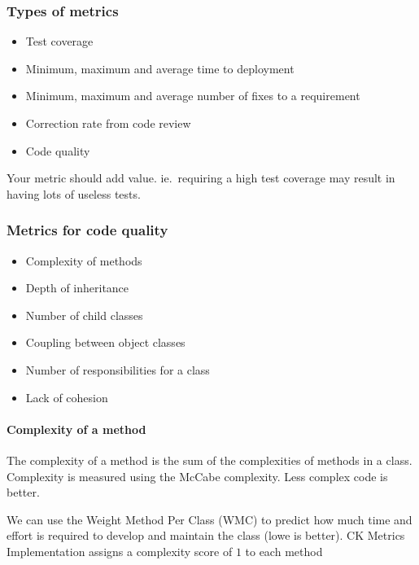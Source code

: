 \subsubsection{Types of metrics}\label{ssub:types_of_metrics}

\begin{itemize}
    \item Test coverage
    \item Minimum, maximum and average time to deployment
    \item Minimum, maximum and average number of fixes to a requirement
    \item Correction rate from code review
    \item Code quality
\end{itemize}

\begin{note}
    Your metric should add value. ie.\ requiring a high test coverage may result in having lots of useless tests.
\end{note}

\subsubsection{Metrics for code quality}\label{ssub:metrics_for_code_quality}

\begin{itemize}
    \item Complexity of methods
    \item Depth of inheritance
    \item Number of child classes
    \item Coupling between object classes
    \item Number of responsibilities for a class
    \item Lack of cohesion
\end{itemize}

\paragraph{Complexity of a method}\label{par:complexity_of_a_method}

The complexity of a method is the sum of the complexities of methods in a class.
Complexity is measured using the McCabe complexity.
Less complex code is better.

We can use the Weight Method Per Class (WMC) to predict how much time and effort is required to develop and maintain the class (lowe is better).
CK Metrics Implementation assigns a complexity score of \(1\) to each method


